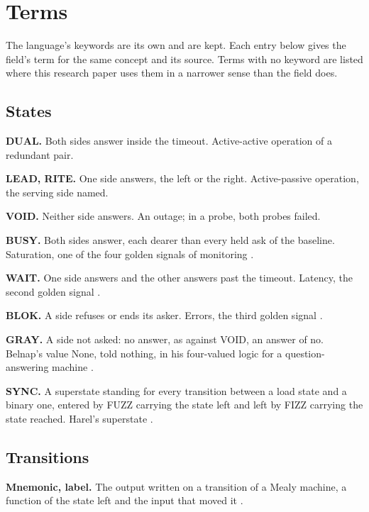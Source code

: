 \chapter{Terms}
\label{ch:terms}

The language's keywords are its own and are kept. Each entry below gives the field's term for
the same concept and its source. Terms with no keyword are listed where this research paper uses
them in a narrower sense than the field does.

\section{States}

\noindent\textbf{DUAL.} Both sides answer inside the timeout. Active-active operation of a
redundant pair.

\noindent\textbf{LEAD, RITE.} One side answers, the left or the right. Active-passive operation,
the serving side named.

\noindent\textbf{VOID.} Neither side answers. An outage; in a probe, both probes failed.

\noindent\textbf{BUSY.} Both sides answer, each dearer than every held ask of the baseline.
Saturation, one of the four golden signals of monitoring \cite{src:SRE}.

\noindent\textbf{WAIT.} One side answers and the other answers past the timeout. Latency, the
second golden signal \cite{src:SRE}.

\noindent\textbf{BLOK.} A side refuses or ends its asker. Errors, the third golden signal
\cite{src:SRE}.

\noindent\textbf{GRAY.} A side not asked: no answer, as against VOID, an answer of no. Belnap's
value None, told nothing, in his four-valued logic for a question-answering machine
\cite{src:Belnap}.

\noindent\textbf{SYNC.} A superstate standing for every transition between a load state and a
binary one, entered by FUZZ carrying the state left and left by FIZZ carrying the state reached.
Harel's superstate \cite{src:Harel}.

\section{Transitions}

\noindent\textbf{Mnemonic, label.} The output written on a transition of a Mealy machine, a
function of the state left and the input that moved it \cite{src:Mealy}.

